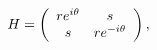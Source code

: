 \begin{equation}
H=\left(\begin{array}{cc} re^{i\theta} & s \cr s & re^{-i\theta}
\end{array}\right),
\label{e21}
\end{equation}

